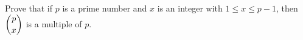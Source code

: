 Prove that if $p$ is a prime number and $x$ is an integer with $1\le x\le p-1$, then $\dbinom px$ is a multiple of $p$.
